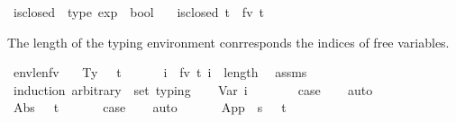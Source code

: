 \begin{isabellebody}
\isanewline
\isanewline
{}\isamarkupfalse%
\ is{\isacharunderscore}{\kern0pt}closed\ {\isacharcolon}{\kern0pt}{\isacharcolon}{\kern0pt}\ {\isachardoublequoteopen}type\ exp\ {\isasymRightarrow}\ bool{\isachardoublequoteclose}\ \isanewline
\ \ {\isachardoublequoteopen}is{\isacharunderscore}{\kern0pt}closed\ t\ {\isasymequiv}\ fv\ t\ {\isacharequal}{\kern0pt}\ {\isacharbraceleft}{\kern0pt}{\isacharbraceright}{\kern0pt}{\isachardoublequoteclose}%
\begin{isamarkuptext}%
The length of the typing environment conrresponds the indices of free variables.%
\end{isamarkuptext}\isamarkuptrue%
\isamarkupfalse%
\ envlen{\isacharunderscore}{\kern0pt}fv{\isacharcolon}{\kern0pt}\isanewline
\ \ \ Ty{\isacharcolon}{\kern0pt}\ {\isachardoublequoteopen}{\isasymGamma}\ {\isasymturnstile}\ t\ {\isacharcolon}{\kern0pt}\ {\isasymtau}{\isachardoublequoteclose}\isanewline
\ \ \ {\isachardoublequoteopen}{\isasymforall}\ i\ {\isasymin}\ fv\ t{\isachardot}{\kern0pt}\ i\ {\isacharless}{\kern0pt}\ length\ {\isasymGamma}{\isachardoublequoteclose}\isanewline
%
\isadelimproof
%
\endisadelimproof
%
\isatagproof
{}\isamarkupfalse%
\ assms\isanewline
{}\isamarkupfalse%
\ {\isacharparenleft}{\kern0pt}induction\ arbitrary{\isacharcolon}{\kern0pt}\ {\isasymtau}\ set{\isacharcolon}{\kern0pt}\ typing{\isacharparenright}{\kern0pt}\isanewline
\ \ \isamarkupfalse%
\ {\isacharparenleft}{\kern0pt}Var\ i\ {\isasymGamma}{\isacharprime}{\kern0pt}\ {\isasymtau}{\isacharparenright}{\kern0pt}\isanewline
\ \ \isamarkupfalse%
\ \isamarkupfalse%
\ {\isacharquery}{\kern0pt}case\isanewline
\ \ \isamarkupfalse%
\ auto\isanewline
\ \ \isamarkupfalse%
\isanewline
{}\isamarkupfalse%
\isanewline
\ \ \isamarkupfalse%
\ {\isacharparenleft}{\kern0pt}Abs\ {\isasymtau}{}\ {\isasymGamma}\ t\ {\isasymtau}{}{\isacharparenright}{\kern0pt}\isanewline
\ \ \isamarkupfalse%
\ \isamarkupfalse%
\ {\isacharquery}{\kern0pt}case\isanewline
\ \ \isamarkupfalse%
\ auto\isanewline
\ \ \isamarkupfalse%
\isanewline
{}\isamarkupfalse%
\isanewline
\ \ \isamarkupfalse%
\ {\isacharparenleft}{\kern0pt}App\ {\isasymGamma}\ s\ {\isasymtau}\ {\isasymtau}{}\ t{\isacharparenright}{\kern0pt}\isanewline

\end{isabellebody}
